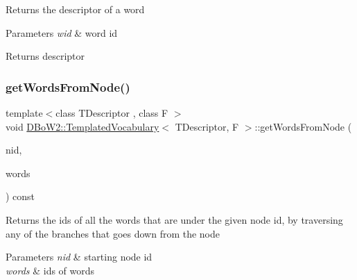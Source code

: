 Returns the descriptor of a word 
\begin{DoxyParams}{Parameters}
{\em wid} & word id \\
\hline
\end{DoxyParams}
\begin{DoxyReturn}{Returns}
descriptor 
\end{DoxyReturn}
\mbox{\label{class_d_bo_w2_1_1_templated_vocabulary_a809f881020a2b953664b1f528828551e}} 
\subsubsection{\texorpdfstring{get\+Words\+From\+Node()}{getWordsFromNode()}}
{\footnotesize\ttfamily template$<$class T\+Descriptor , class F $>$ \\
void \mbox{\hyperlink{class_d_bo_w2_1_1_templated_vocabulary}{D\+Bo\+W2\+::\+Templated\+Vocabulary}}$<$ T\+Descriptor, F $>$\+::get\+Words\+From\+Node (\begin{DoxyParamCaption}\item[{\mbox{\hyperlink{namespace_d_bo_w2_a3a0fa9c50c0df508759362d6204566f2}{Node\+Id}}}]{nid,  }\item[{std\+::vector$<$ \mbox{\hyperlink{namespace_d_bo_w2_ab1a0d3283b2d4690a383372ed20bfeb5}{Word\+Id}} $>$ \&}]{words }\end{DoxyParamCaption}) const}

Returns the ids of all the words that are under the given node id, by traversing any of the branches that goes down from the node 
\begin{DoxyParams}{Parameters}
{\em nid} & starting node id \\
\hline
{\em words} & ids of words \\
\hline
\end{DoxyParams}
\mbox{\label{class_d_bo_w2_1_1_templated_vocabulary_ace5645b42739bea1e3da05c6cff60bad}} 
